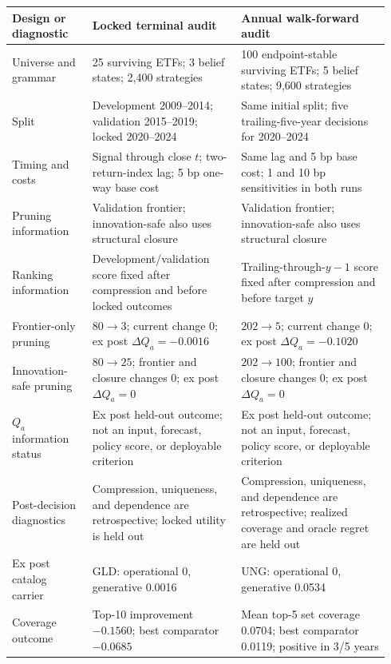\begin{tabular}{@{}p{0.20\linewidth}p{0.37\linewidth}p{0.37\linewidth}@{}}
\toprule
Design or diagnostic & Locked terminal audit & Annual walk-forward audit \\
\midrule
Universe and grammar & 25 surviving ETFs; 3 belief states; 2,400 strategies & 100 endpoint-stable surviving ETFs; 5 belief states; 9,600 strategies \\
Split & Development 2009--2014; validation 2015--2019; locked 2020--2024 & Same initial split; five trailing-five-year decisions for 2020--2024 \\
Timing and costs & Signal through close \(t\); two-return-index lag; 5 bp one-way base cost & Same lag and 5 bp base cost; 1 and 10 bp sensitivities in both runs \\
Pruning information & Validation frontier; innovation-safe also uses structural closure & Validation frontier; innovation-safe also uses structural closure \\
Ranking information & Development/validation score fixed after compression and before locked outcomes & Trailing-through-\(y-1\) score fixed after compression and before target \(y\) \\
Frontier-only pruning & \(80\to3\); current change 0; ex post \(\Delta Q_a=-0.0016\) & \(202\to5\); current change 0; ex post \(\Delta Q_a=-0.1020\) \\
Innovation-safe pruning & \(80\to25\); frontier and closure changes 0; ex post \(\Delta Q_a=0\) & \(202\to100\); frontier and closure changes 0; ex post \(\Delta Q_a=0\) \\
\(Q_a\) information status & Ex post held-out outcome; not an input, forecast, policy score, or deployable criterion & Ex post held-out outcome; not an input, forecast, policy score, or deployable criterion \\
Post-decision diagnostics & Compression, uniqueness, and dependence are retrospective; locked utility is held out & Compression, uniqueness, and dependence are retrospective; realized coverage and oracle regret are held out \\
Ex post catalog carrier & GLD: operational 0, generative 0.0016 & UNG: operational 0, generative 0.0534 \\
Coverage outcome & Top-10 improvement \(-0.1560\); best comparator \(-0.0685\) & Mean top-5 set coverage 0.0704; best comparator 0.0119; positive in 3/5 years \\
\bottomrule
\end{tabular}
